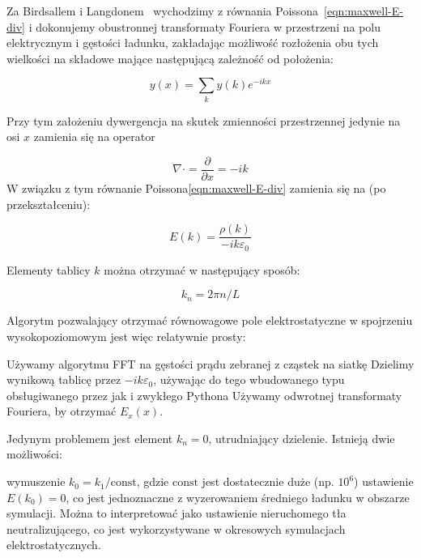 Za Birdsallem i Langdonem~\cite{birdsall} wychodzimy z równania Poissona~\ref{eqn:maxwell-E-div} i dokonujemy
obustronnej transformaty Fouriera w przestrzeni na polu elektrycznym i gęstości ładunku,
zakładając możliwość rozłożenia obu tych wielkości na składowe mające następującą zależność
od położenia:

\begin{equation}
y(x) = \sum_k y(k) e^{-i k x}
\label{eqn:fourier-decomposition}
\end{equation}

Przy tym założeniu dywergencja na skutek zmienności przestrzennej jedynie na osi $x$
zamienia się na operator

\begin{equation}
\nabla \cdot = \frac{\partial}{\partial x} = -ik
\end{equation}
W związku z tym równanie Poissona\ref{eqn:maxwell-E-div} zamienia się na (po przekształceniu):

\begin{equation}
    E(k) = \frac{\rho(k)}{-ik \varepsilon_0}
\end{equation}

Elementy tablicy $k$ można otrzymać w następujący sposób:

\begin{equation}
    k_n = 2 \pi n / L
\end{equation}


Algorytm pozwalający otrzymać równowagowe pole elektrostatyczne w spojrzeniu wysokopoziomowym jest więc relatywnie prosty:
\begin{enumerate}
\itemi{} Używamy algorytmu FFT na gęstości prądu zebranej z cząstek na siatkę
\itemi{} Dzielimy wynikową tablicę przez $-ik \varepsilon_0$, używając do tego wbudowanego typu  obsługiwanego przez  jak i zwykłego Pythona
\itemi{} Używamy odwrotnej transformaty Fouriera, by otrzymać $E_x(x)$.
\end{enumerate}

Jedynym problemem jest element $k_n = 0$, utrudniający dzielenie. Istnieją dwie możliwości:
\begin{itemize}
\itemi{} wymuszenie $k_0 = k_1 / \text{const}$, gdzie $\text{const}$ jest dostatecznie duże (np. $10^6$)
\itemi{} ustawienie $E(k_0) = 0$, co jest jednoznaczne z wyzerowaniem średniego ładunku w
obszarze symulacji. Można to interpretować jako ustawienie nieruchomego tła neutralizującego,
co jest wykorzystywane w okresowych symulacjach elektrostatycznych.
\end{itemize}
